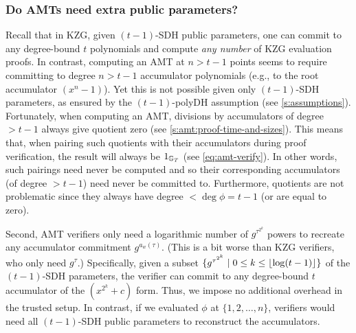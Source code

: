 %
%

\subsubsection{Do AMTs need extra public parameters?}
\label{s:amt:public-parameters}
Recall that in KZG, given $(t-1)$-SDH public parameters, one can commit to any degree-bound $t$ polynomials and compute \textit{any number} of KZG evaluation proofs.
In contrast, computing an AMT at $n > t-1$ points seems to require committing to degree $n > t-1$ accumulator polynomials (e.g., to the root accumulator $(x^n-1)$).
Yet this is not possible given only $(t-1)$-SDH parameters, as ensured by the $(t-1)$-polyDH assumption (see \cref{s:assumptions}).
Fortunately, when computing an AMT, divisions by accumulators of degree $> t-1$ always give quotient zero (see \cref{s:amt:proof-time-and-sizes}).
This means that, when pairing such quotients with their accumulators during proof verification, the result will always be $1_{\mathbb{G}_T}$ (see \cref{eq:amt-verify}).
In other words, such pairings need never be computed and so their corresponding accumulators (of degree $>t-1$) need never be committed to.
Furthermore, quotients are not problematic since they always have degree $< \deg{\phi} = t-1$ (or are equal to zero).

Second, AMT verifiers only need a logarithmic number of $g^{\tau^{2^k}}$ powers to recreate any accumulator commitment $g^{a_w(\tau)}$.
(This is a bit worse than KZG verifiers, who only need $g^\tau$.)
Specifically, given a subset $\{g^{\tau^{2^k}} \mathrel| 0 \le k\le \lfloor\log(t-1)\rfloor\}$ of the $(t-1)$-SDH parameters, the verifier can commit to any degree-bound $t$ accumulator of the $(x^{2^k}+c)$ form.
Thus, we impose no additional overhead in the trusted setup. 
In contrast, if we evaluated $\phi$ at $\{1,2,\dots, n\}$, verifiers would need all $(t-1)$-SDH public parameters to reconstruct the accumulators.

